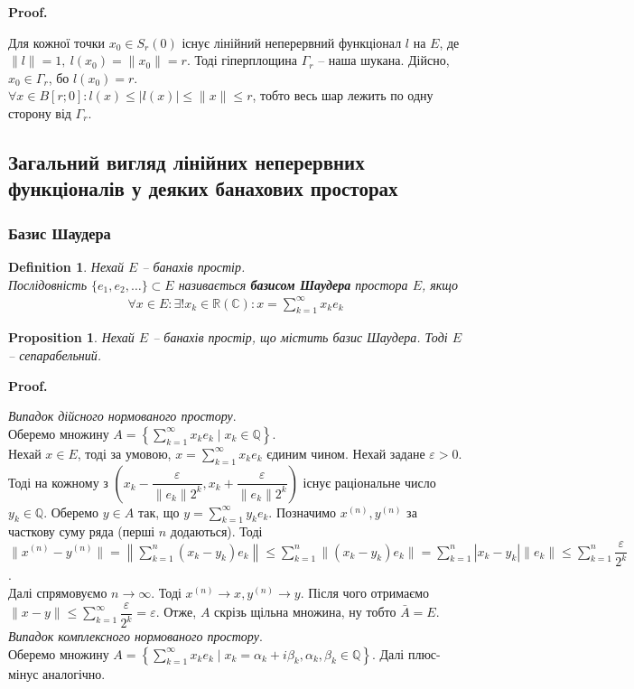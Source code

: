 \documentclass[a4paper, 10pt]{article}
\makeatletter
\theoremstyle{theoremdd}
\theoremstyle{theoremdd}
\newtheorem{definition}[theorem]{Definition}
\theoremstyle{theoremdd}
\theoremstyle{theoremdd}
\theoremstyle{theoremdd}
\newtheorem{proposition}[theorem]{Proposition}
\theoremstyle{theoremdd}
\theoremstyle{theoremdd}
\theoremstyle{theoremdd}
\renewenvironment{proof}[1][Proof.\\]{\par
\pushQED{\hfill \qed}%
\normalfont \topsep6\p@\@plus6\p@\relax
\trivlist
\item\relax
{\bfseries
#1\@addpunct{.}}\hspace\labelsep\ignorespaces
}{%
\popQED\endtrivlist\@endpefalse
}
\makeatother
\begin{document}
\begin{proof}
Для кожної точки $x_0 \in S_r(0)$ існує лінійний неперервний функціонал $l$ на $E$, де $\|l\| = 1,\ l(x_0) = \|x_0\| = r$. Тоді гіперплощина $\Gamma_r$ -- наша шукана. Дійсно, $x_0 \in \Gamma_r$, бо $l(x_0) = r$.\\
$\forall x \in B[r;0]: l(x) \leq |l(x)| \leq \|x\| \leq r$, тобто весь шар лежить по одну сторону від $\Gamma_r$.
\end{proof}
\fi

\subsection{Загальний вигляд лінійних неперервних функціоналів у деяких банахових просторах}
\subsubsection{Базис Шаудера}
\begin{definition}
Нехай $E$ -- банахів простір.\\
Послідовність $\{e_1,e_2,\dots\} \subset E$ називається \textbf{базисом Шаудера} простора $E$, якщо
\begin{align*}
\forall x \in E: \exists ! x_k \in \mathbb{R} (\mathbb{C}): x = \displaystyle\sum_{k=1}^\infty x_k e_k
\end{align*}
\end{definition}

\begin{proposition}
Нехай $E$ -- банахів простір, що містить базис Шаудера. Тоді $E$ -- сепарабельний.
\end{proposition}

\begin{proof}
\textit{Випадок дійсного нормованого простору}.\\
Оберемо множину $A = \left\{ \displaystyle\sum_{k=1}^\infty x_k e_k \mid x_k \in \mathbb{Q} \right\}$.\\
Нехай $x \in E$, тоді за умовою, $x = \displaystyle\sum_{k=1}^\infty x_k e_k$ єдиним чином. Нехай задане $\varepsilon > 0$. Тоді на кожному з $\left(x_k-\dfrac{\varepsilon}{\|e_k\| 2^k},x_k + \dfrac{\varepsilon}{\|e_k\| 2^k} \right)$ існує раціональне число $y_k \in \mathbb{Q}$. Оберемо $y \in A$ так, що $y = \displaystyle\sum_{k=1}^\infty y_k e_k$. Позначимо $x^{(n)},y^{(n)}$ за часткову суму ряда (перші $n$ додаються). Тоді\\
$\|x^{(n)} - y^{(n)}\| = \displaystyle\left\| \sum_{k=1}^n (x_k-y_k) e_k \right\| \leq \sum_{k=1}^n \| (x_k-y_k) e_k \| = \sum_{k=1}^n |x_k-y_k| \|e_k\| \leq \sum_{k=1}^n \dfrac{\varepsilon}{2^k}$.\\
Далі спрямовуємо $n \to \infty$. Тоді $x^{(n)} \to x, y^{(n)} \to y$. Після чого отримаємо $\|x-y\| \displaystyle \leq \sum_{k=1}^\infty \dfrac{\varepsilon}{2^k} = \varepsilon$. Отже, $A$ скрізь щільна множина, ну тобто $\bar{A} = E$.
\bigskip \\
\textit{Випадок комплексного нормованого простору}.\\
Оберемо множину $A = \left\{ \displaystyle\sum_{k=1}^\infty x_k e_k \mid x_k = \alpha_k + i \beta_k, \alpha_k, \beta_k \in \mathbb{Q} \right\}$. Далі плюс-мінус аналогічно.
\end{proof}
\end{document}
